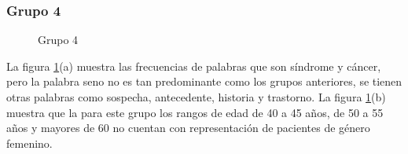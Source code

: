
\subsubsection*{Grupo 4}

\begin{figure}[h!]
	\centering
	\caption{Grupo 4} \label{fig:c4}
\end{figure}

La figura \ref{fig:c4}(a) muestra las frecuencias de palabras que son síndrome y cáncer, pero la palabra seno no es tan predominante como los grupos anteriores, se tienen otras palabras como sospecha, antecedente, historia y trastorno. La figura \ref{fig:c4}(b) muestra que la para este grupo los rangos de edad de 40 a 45 años, de 50 a 55 años y mayores de 60 no cuentan con representación de pacientes de género femenino. 


